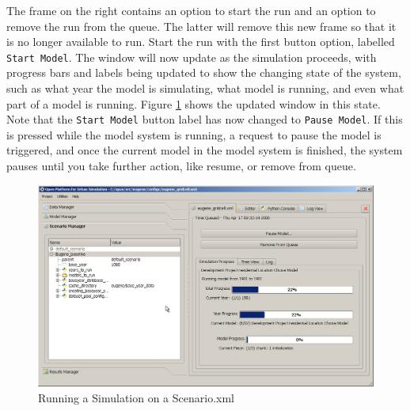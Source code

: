 The frame on the right contains an option to start the run and an option to remove the run from the queue.  The latter will remove this new frame so that it is no longer available to run.  Start the run with the first button option, labelled \verb#Start Model#.  The window will now update as the simulation proceeds, with progress bars and labels being updated to show the changing state of the system, such as what year the model is simulating, what model is running, and even what part of a model is running.  Figure \ref{fig:opus-running} shows the updated window in this state.  Note that the \verb#Start Model#  button label has now changed to \verb#Pause Model#.  If this is pressed while the model system is running, a request to pause the model is triggered, and once the current model in the model system is finished, the system pauses until you take further action, like resume, or remove from queue.

\begin{figure}[htp]
\begin{center}
\includegraphics[scale=0.4]{graphics/opus-running.png}
\end{center}
\caption{Running a Simulation on a Scenario.xml}
\label{fig:opus-running}
\end{figure}


